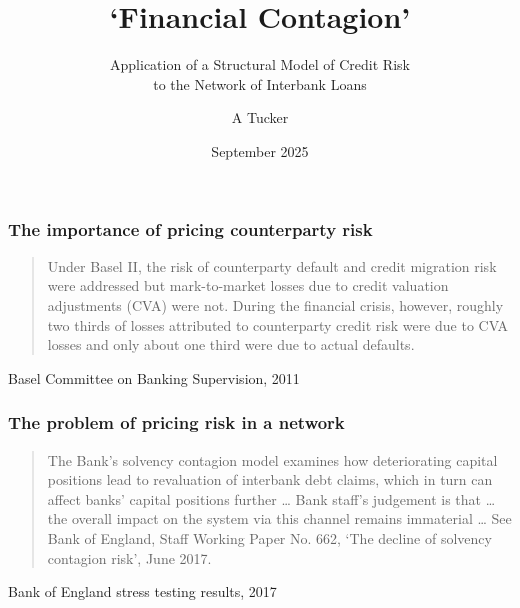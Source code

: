 \documentclass{beamer}
\title[Pricing Interbank Debt]
{`Financial Contagion'}
\subtitle {Application of a Structural Model of Credit Risk\\
  to the Network of Interbank Loans}
\author {A Tucker} %
\institute%
{SYSRISK}
\date
{September 2025}
\begin{document}
\begin{frame}[plain, label=titlepage]
  \titlepage
\end{frame}




\begin{frame}[label=baselquote]
  \frametitle{The importance of pricing counterparty risk}
  \begin{quotation}
    Under Basel II, the risk of counterparty default and credit migration risk were addressed but mark-to-market losses due to credit valuation adjustments (CVA) were not. During the financial crisis, however, roughly two thirds of losses attributed to counterparty credit risk were due to CVA losses and only about one third were due to actual defaults.
  \end{quotation}
  \begin{flushright}
    Basel Committee on Banking Supervision, 2011
  \end{flushright}
\end{frame}

\begin{frame}[label=boequote]
  \frametitle{The problem of pricing risk in a network}
  \begin{quotation}
    The Bank's \alert{solvency contagion model} examines how deteriorating
    capital positions lead to revaluation of interbank debt claims,
    which in turn can affect banks' capital positions further \dots
    Bank staff's judgement is that \dots the overall impact on the system
    via this channel remains immaterial \dots
    See Bank of England, Staff Working Paper No. 662,
    `The decline of solvency contagion risk', June 2017.
  \end{quotation}
  \begin{flushright}
    Bank of England stress testing results, 2017
  \end{flushright}
\end{frame}
\end{document}
